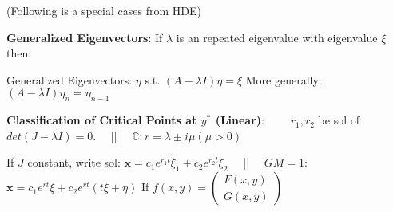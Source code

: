 \documentclass[9pt]{article}
\begin{document}
(Following is a special cases from HDE)

\textbf{Generalized Eigenvectors}: If $\lambda$ is an repeated eigenvalue with eigenvalue $\xi$ then:

\quad Generalized Eigenvectors: $\eta$ s.t. $(A-\lambda I)\eta=\xi$ \quad \quad More generally: $(A-\lambda I)\eta_n=\eta_{n-1}$

\textbf{Classification of Critical Points at $y^*$ (Linear)}: \ \ \ \ $r_1,r_2$ be sol of $det(J-\lambda I)=0$. \ \ || \ \ $\mathbb{C}:r=\lambda\pm i\mu(\mu>0)$ 

If $J$ constant, write sol: $\mathbf{x}=c_1e^{r_1t}\xi_1+c_2e^{r_2t}\xi_2$ \ \ || \ \ $GM=1$: $\mathbf{x}=c_1e^{rt}\xi+c_2e^{rt}(t\xi+\eta)$  {\tiny If $f(x,y)=\begin{pmatrix}F(x,y) \\ G(x,y)\end{pmatrix}$}
\end{document}
